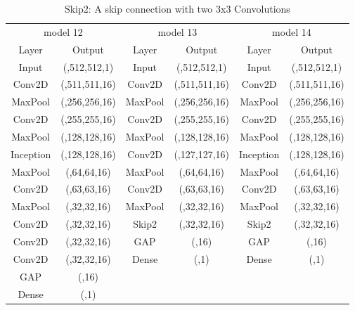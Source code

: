 \documentclass[
a4paper, 
12pt,
grayscalebody, %
abstract=on,
twoside, BCOR10mm, 12pt, DIV13,headinclude, footexclude, final, abstracton, openright
]{ibireprt}
\numberwithin{equation}{chapter}
\numberwithin{table}{chapter}
\numberwithin{figure}{chapter}
\numberwithin{algorithm}{chapter}
\numberwithin{example}{chapter}
\numberwithin{example}{chapter}
\begin{document}
\begin{table}
	\begin{tabular}{cccccc}
		\toprule
		\multicolumn{2}{c}{model 12} &\multicolumn{2}{c}{model 13} & \multicolumn{2}{c}{model 14} \\ 
		Layer & Output &Layer & Output &Layer & Output\\
		\cmidrule(l){1-2} \cmidrule(l){3-4}\cmidrule(l){5-6}
		Input&(,512,512,1)&Input&(,512,512,1)&Input&(,512,512,1)\\
		\cmidrule(l){1-2} \cmidrule(l){3-4}\cmidrule(l){5-6}
		Conv2D& (,511,511,16) &Conv2D	& (,511,511,16)&Conv2D	& (,511,511,16)\\
		\cmidrule(l){1-2} \cmidrule(l){3-4}\cmidrule(l){5-6}
		MaxPool&(,256,256,16)&MaxPool&(,256,256,16)&MaxPool&(,256,256,16)\\
		\cmidrule(l){1-2} \cmidrule(l){3-4}\cmidrule(l){5-6}
		Conv2D&(,255,255,16)&Conv2D&(,255,255,16)&Conv2D&(,255,255,16)\\
		\cmidrule(l){1-2} \cmidrule(l){3-4}\cmidrule(l){5-6}
		MaxPool&(,128,128,16)&MaxPool&(,128,128,16)&MaxPool&(,128,128,16)\\
		\cmidrule(l){1-2} \cmidrule(l){3-4}\cmidrule(l){5-6}
		Inception&(,128,128,16)&Conv2D&(,127,127,16)&Inception&(,128,128,16)\\
		\cmidrule(l){1-2} \cmidrule(l){3-4}\cmidrule(l){5-6}
		MaxPool&(,64,64,16)&MaxPool&(,64,64,16)&MaxPool&(,64,64,16)\\
		\cmidrule(l){1-2} \cmidrule(l){3-4}\cmidrule(l){5-6}
		Conv2D&(,63,63,16)&Conv2D&(,63,63,16)&Conv2D&(,63,63,16)\\
		\cmidrule(l){1-2} \cmidrule(l){3-4}\cmidrule(l){5-6}
		MaxPool&(,32,32,16)&MaxPool&(,32,32,16)&MaxPool&(,32,32,16)\\
		\cmidrule(l){1-2} \cmidrule(l){3-4}\cmidrule(l){5-6}
		Conv2D&(,32,32,16)&Skip2&(,32,32,16)&Skip2&(,32,32,16)\\
		\cmidrule(l){1-2} \cmidrule(l){3-4}\cmidrule(l){5-6}
		Conv2D&(,32,32,16)&GAP&(,16)&GAP&(,16)\\
		\cmidrule(l){1-2} \cmidrule(l){3-4}\cmidrule(l){5-6}
		Conv2D&(,32,32,16)&Dense&(,1)&Dense&(,1)\\
		\cmidrule(l){1-2}
		GAP&(,16)&&&&\\
		\cmidrule(l){1-2}
		Dense&(,1)&&&&\\
		
	\end{tabular}
	\caption{Skip2: A skip connection with two 3x3 Convolutions}
	
\end{table}
\end{document}
